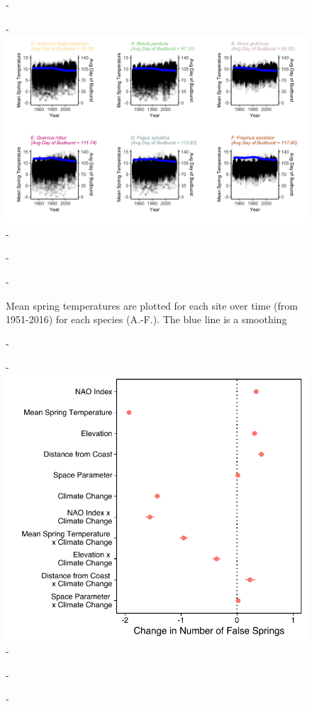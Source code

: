 \documentclass{article}\usepackage[]{graphicx}\usepackage[]{color}
\begin{document}
{\begin{figure} [H]
  -\begin{center}
  -\includegraphics[width=12cm]{..//figures/MSTBB_bySpp.png}
  -\caption{Mean spring temperatures are plotted for each site over time (from 1951-2016) for each species (A.-F.). The blue line is a smoothing }\label{fig:mst}
  -\end{center}
  -\end{figure}}
  
  
{\begin{figure} [H]
  -\begin{center}
  -\includegraphics[width=16cm]{..//figures/model_output_dvr.pdf}
  -\caption{}\label{fig:maineffects}
  -\end{center}
  -\end{figure}}
  
\end{document}
